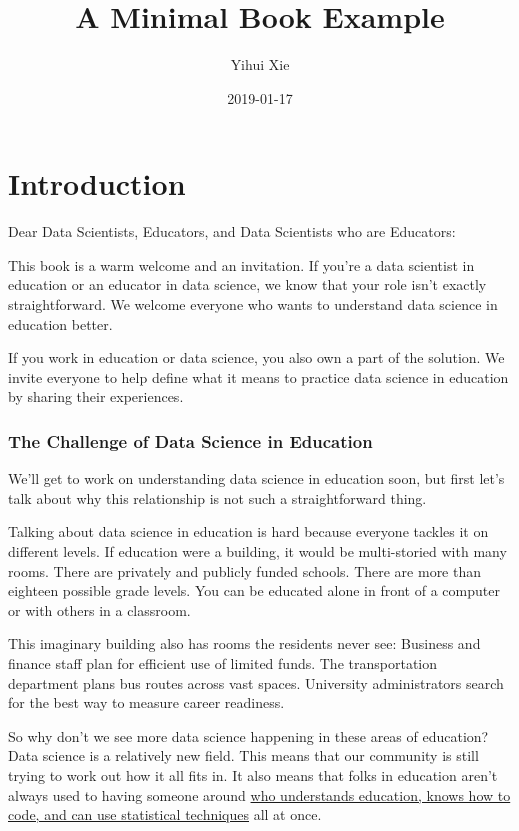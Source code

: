 \documentclass[]{book}
\title{A Minimal Book Example}
\author{Yihui Xie}
\date{2019-01-17}
\begin{document}
\maketitle

{
\setcounter{tocdepth}{1}
\tableofcontents
}
\chapter{Introduction}\label{introduction}

Dear Data Scientists, Educators, and Data Scientists who are Educators:

This book is a warm welcome and an invitation. If you're a data
scientist in education or an educator in data science, we know that your
role isn't exactly straightforward. We welcome everyone who wants to
understand data science in education better.

If you work in education or data science, you also own a part of the
solution. We invite everyone to help define what it means to practice
data science in education by sharing their experiences.

\subsection{The Challenge of Data Science in
Education}\label{the-challenge-of-data-science-in-education}

We'll get to work on understanding data science in education soon, but
first let's talk about why this relationship is not such a
straightforward thing.

Talking about data science in education is hard because everyone tackles
it on different levels. If education were a building, it would be
multi-storied with many rooms. There are privately and publicly funded
schools. There are more than eighteen possible grade levels. You can be
educated alone in front of a computer or with others in a classroom.

This imaginary building also has rooms the residents never see: Business
and finance staff plan for efficient use of limited funds. The
transportation department plans bus routes across vast spaces.
University administrators search for the best way to measure career
readiness.

So why don't we see more data science happening in these areas of
education? Data science is a relatively new field. This means that our
community is still trying to work out how it all fits in. It also means
that folks in education aren't always used to having someone around
\href{http://drewconway.com/zia/2013/3/26/the-data-science-venn-diagram}{who
understands education, knows how to code, and can use statistical
techniques} all at once.
\end{document}

